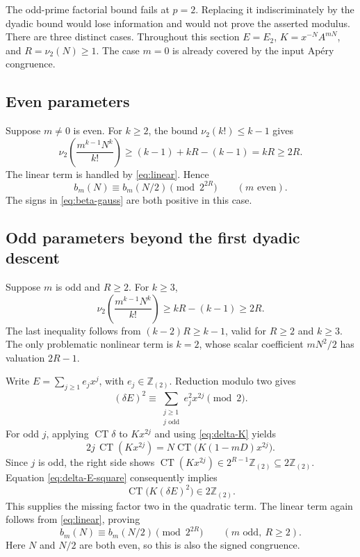 \documentclass[11pt,letterpaper]{article}
\numberwithin{equation}{section}
\theoremstyle{definition}
\newcommand{\Z}{\mathbb Z}
\newcommand{\Ztwo}{\Z_{(2)}}
\newcommand{\dd}{\delta}
\newcommand{\CT}{\operatorname{CT}}
\begin{document}
The odd-prime factorial bound fails at $p=2$. Replacing it indiscriminately
by the dyadic bound would lose information and would not prove the
asserted modulus. There are three distinct cases. Throughout this section
$E=E_2$, $K=x^{-N}A^{mN}$, and $R=\nu_2(N)\geq1$.
The case $m=0$ is already covered by the input Ap\'ery congruence.

\subsection{Even parameters}

Suppose $m\neq0$ is even. For $k\geq2$, the bound
$\nu_2(k!)\leq k-1$ gives
\[
\nu_2\left(\frac{m^{k-1}N^k}{k!}\right)
\geq(k-1)+kR-(k-1)=kR\geq2R.
\]
The linear term is handled by \eqref{eq:linear}. Hence
\begin{equation}\label{eq:two-even}
b_m(N)\equiv b_m(N/2)\pmod{2^{2R}}
\qquad(m\text{ even}).
\end{equation}
The signs in \eqref{eq:beta-gauss} are both positive in this case.

\subsection{Odd parameters beyond the first dyadic descent}

Suppose $m$ is odd and $R\geq2$. For $k\geq3$,
\[
\nu_2\left(\frac{m^{k-1}N^k}{k!}\right)
\geq kR-(k-1)\geq2R.
\]
The last inequality follows from
$(k-2)R\geq k-1$, valid for $R\geq2$ and $k\geq3$.
The only problematic nonlinear term is $k=2$, whose scalar coefficient
$mN^2/2$ has valuation $2R-1$.

Write $E=\sum_{j\geq1}e_jx^j$, with $e_j\in\Ztwo$.
Reduction modulo two gives
\begin{equation}\label{eq:delta-E-square}
(\dd E)^2\equiv\sum_{\substack{j\geq1\\j\text{ odd}}}
 e_j^2x^{2j}\pmod2.
\end{equation}
For odd $j$, applying $\CT\dd$ to $Kx^{2j}$ and using
\eqref{eq:delta-K} yields
\begin{equation}\label{eq:ct-even}
2j\,\CT(Kx^{2j})
=N\CT\bigl(K(1-mD)x^{2j}\bigr).
\end{equation}
Since $j$ is odd, the right side shows
$\CT(Kx^{2j})\in2^{R-1}\Ztwo\subseteq2\Ztwo$.
Equation \eqref{eq:delta-E-square} consequently implies
\[
\CT\bigl(K(\dd E)^2\bigr)\in2\Ztwo.
\]
This supplies the missing factor two in the quadratic term. The linear
term again follows from \eqref{eq:linear}, proving
\begin{equation}\label{eq:two-higher}
b_m(N)\equiv b_m(N/2)\pmod{2^{2R}}
\qquad(m\text{ odd},\ R\geq2).
\end{equation}
Here $N$ and $N/2$ are both even, so this is also the signed congruence.
\end{document}
